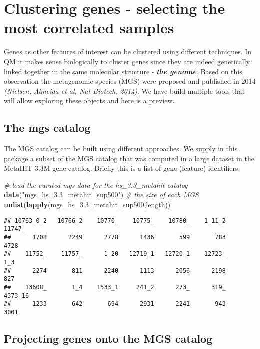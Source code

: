 \documentclass[]{article}
\newenvironment{Shaded}{\begin{snugshade}}{\end{snugshade}}
\newcommand{\KeywordTok}[1]{\textcolor[rgb]{0.13,0.29,0.53}{\textbf{{#1}}}}
\newcommand{\StringTok}[1]{\textcolor[rgb]{0.31,0.60,0.02}{{#1}}}
\newcommand{\CommentTok}[1]{\textcolor[rgb]{0.56,0.35,0.01}{\textit{{#1}}}}
\newcommand{\NormalTok}[1]{{#1}}
\begin{document}
\section{Clustering genes - selecting the most correlated
samples}\label{clustering-genes---selecting-the-most-correlated-samples}

Genes as other features of interest can be clustered using different
techniques. In QM it makes sense biologically to cluster genes since
they are indeed genetically linked together in the same molecular
structure - \textbf{\emph{the genome}}. Based on this observation the
metagenomic species (MGS) were proposed and published in 2014
\emph{(Nielsen, Almeida et al, Nat Biotech, 2014)}. We have build
multiple tools that will allow exploring these objects and here is a
preview.

\subsection{The mgs catalog}\label{the-mgs-catalog}

The MGS catalog can be built using different approaches. We supply in
this package a subset of the MGS catalog that was computed in a large
dataset in the MetaHIT 3.3M gene catalog. Briefly this is a list of gene
(feature) identifiers.

\begin{Shaded}
\begin{Highlighting}[]
\CommentTok{# load the curated mgs data for the hs_3.3_metahit catalog}
\KeywordTok{data}\NormalTok{(}\StringTok{"mgs_hs_3.3_metahit_sup500"}\NormalTok{)}
\CommentTok{# the size of each MGS}
\KeywordTok{unlist}\NormalTok{(}\KeywordTok{lapply}\NormalTok{(mgs_hs_3.3_metahit_sup500,length))}
\end{Highlighting}
\end{Shaded}

\begin{verbatim}
## 10763_0_2   10766_2    10770_    10775_    10780_    1_11_2    11747_ 
##      1708      2249      2778      1436       599       783      4728 
##    11752_    11757_      1_20   12719_1   12720_1    12723_       1_3 
##      2274       811      2240      1113      2056      2198       827 
##    13608_       1_4    1533_1     241_2      273_      319_   4373_16 
##      1233       642       694      2931      2241       943      3001
\end{verbatim}

\subsection{Projecting genes onto the MGS
catalog}\label{projecting-genes-onto-the-mgs-catalog}
\end{document}
